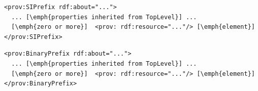 \begin{lstlisting}
<prov:SIPrefix rdf:about="...">
  ... [\emph{properties inherited from TopLevel}] ...
  [\emph{zero or more}]  <prov: rdf:resource="..."/> [\emph{element}] 
</prov:SIPrefix>
\end{lstlisting}



\begin{lstlisting}
<prov:BinaryPrefix rdf:about="...">
  ... [\emph{properties inherited from TopLevel}] ...
  [\emph{zero or more}]  <prov: rdf:resource="..."/> [\emph{element}] 
</prov:BinaryPrefix>
\end{lstlisting}